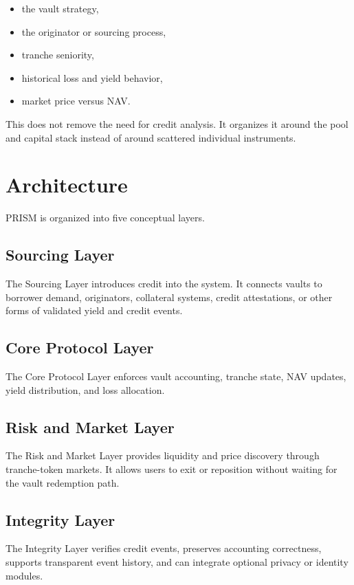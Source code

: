 \documentclass[11pt]{article}
\begin{document}
\begin{itemize}
  \item the vault strategy,
  \item the originator or sourcing process,
  \item tranche seniority,
  \item historical loss and yield behavior,
  \item market price versus NAV.
\end{itemize}

This does not remove the need for credit analysis. It organizes it around the
pool and capital stack instead of around scattered individual instruments.

\section{Architecture}

PRISM is organized into five conceptual layers.

\subsection{Sourcing Layer}

The Sourcing Layer introduces credit into the system. It connects vaults to
borrower demand, originators, collateral systems, credit attestations, or other
forms of validated yield and credit events.

\subsection{Core Protocol Layer}

The Core Protocol Layer enforces vault accounting, tranche state, NAV updates,
yield distribution, and loss allocation.

\subsection{Risk and Market Layer}

The Risk and Market Layer provides liquidity and price discovery through
tranche-token markets. It allows users to exit or reposition without waiting for
the vault redemption path.

\subsection{Integrity Layer}

The Integrity Layer verifies credit events, preserves accounting correctness,
supports transparent event history, and can integrate optional privacy or
identity modules.
\end{document}
